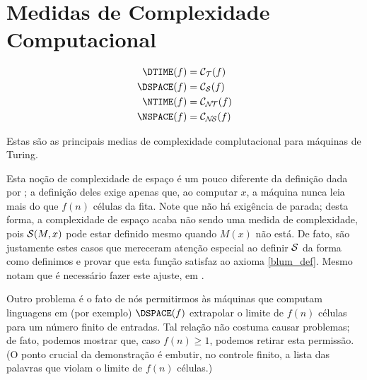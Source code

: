 \section{Medidas de Complexidade Computacional}
\label{medidas_padrao}

\begin{pdefinition}
    \begin{align*}
        \DTIME(f) &= \mathcal C_\PhiDT(f) \\
        \DSPACE(f) &= \mathcal C_\PhiDS(f) \\
        \NTIME(f) &= \mathcal C_\PhiNT(f) \\
        \NSPACE(f) &= \mathcal C_\PhiNS(f)
    \end{align*}
\end{pdefinition}

Estas são as principais medias de complexidade complutacional
para máquinas de Turing.

Esta noção de complexidade de espaço
é um pouco diferente da definição dada por
;
a definição deles exige apenas que,
ao computar $x$,
a máquina nunca leia mais do que $f(n)$ células da fita.
Note que não há exigência de parada;
desta forma,
a complexidade de espaço acaba não sendo uma medida de complexidade,
pois ${\mathcal{S}}(M, x)$ pode estar definido
mesmo quando $M(x)$ não está.
De fato,
são justamente estes casos que mereceram
atenção especial ao definir ${\mathcal{S}}$
da forma como definimos
e provar que esta função satisfaz ao axioma \ref{blum_def}.
Mesmo 
notam que é necessário fazer este ajuste,
em \cite[p.~313]{HopcroftUllman1979}.

Outro problema é o fato de nós permitirmos
às máquinas que computam linguagens em
(por exemplo) $\DSPACE(f)$
extrapolar o limite de $f(n)$ células
para um número finito de entradas.
Tal relação não costuma causar problemas;
de fato,
podemos mostrar que,
caso $f(n) \geq 1$,
podemos retirar esta permissão.
(O ponto crucial da demonstração é embutir,
no controle finito,
a lista das palavras que violam o limite de $f(n)$ células.)

